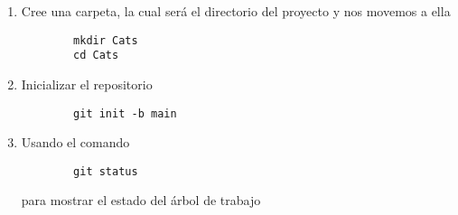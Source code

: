 \begin{enumerate}
    \item Cree una carpeta, la cual será el directorio del proyecto y nos movemos a ella
    \begin{verbatim}
        mkdir Cats
        cd Cats
    \end{verbatim}
    \item Inicializar el repositorio 
    \begin{verbatim}
        git init -b main
    \end{verbatim}
    \item Usando el comando 
    \begin{verbatim}
        git status
    \end{verbatim}
    para mostrar el estado del árbol de trabajo
\end{enumerate}
